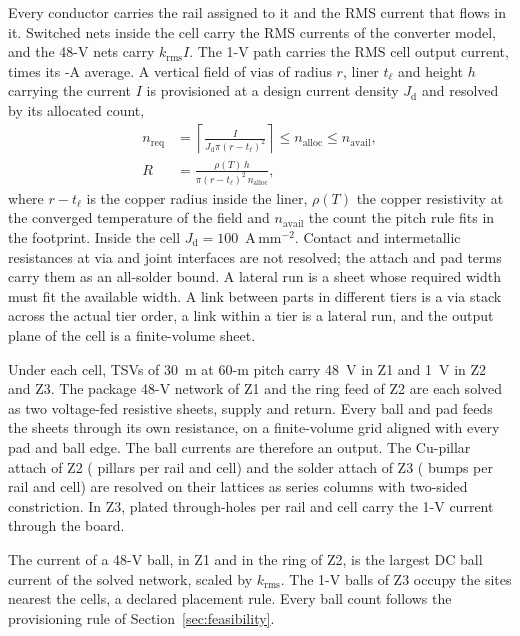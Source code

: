 Every conductor carries the rail assigned to it and the RMS current that flows in it. Switched
nets inside the cell carry the RMS currents of the converter model, and the 48-V nets carry
$k_{\mathrm{rms}} I$. The 1-V path carries the RMS cell output current, \MthIoutRatio{} times its
\FrConvIcell-A average. A vertical field of vias of radius $r$, liner $t_\ell$ and height $h$
carrying the current $I$ is provisioned at a design current density $J_{\mathrm{d}}$ and resolved
by its allocated count,
\begin{equation}
\begin{aligned}
n_{\mathrm{req}} &= \left\lceil \frac{I}{J_{\mathrm{d}}\pi(r-t_\ell)^2}\right\rceil \le
n_{\mathrm{alloc}} \le n_{\mathrm{avail}},\\
R &= \frac{\rho(T)\,h}{\pi(r-t_\ell)^2\,n_{\mathrm{alloc}}},
\end{aligned}
\label{eq:via}
\end{equation}
where $r-t_\ell$ is the copper radius inside the liner, $\rho(T)$ the copper resistivity at the
converged temperature of the field and $n_{\mathrm{avail}}$ the count the pitch rule fits in the
footprint. Inside the cell $J_{\mathrm{d}} = 100$~A\,mm$^{-2}$. Contact and intermetallic
resistances at via and joint interfaces are not resolved; the attach and pad terms carry them
as an all-solder bound. A lateral run is a sheet whose required width must fit the available
width. A link between parts in different tiers is a via stack across the actual tier order, a
link within a tier is a lateral run, and the output plane of the cell is a finite-volume sheet.

Under each cell, \MthTsvCell{} TSVs of 30~\textmu m at 60-\textmu m pitch carry 48~V in Z1 and
1~V in Z2 and Z3. The package 48-V network of Z1 and the ring feed of Z2 are each solved as two
voltage-fed resistive sheets, supply and return. Every ball and pad feeds the sheets through its
own resistance, on a finite-volume grid aligned with every pad and ball edge. The ball currents
are therefore an output. The Cu-pillar attach of Z2 (\MthPillarCell{} pillars per rail and cell)
and the solder attach of Z3 (\MthZthreeBumps{} bumps per rail and cell) are resolved on their
lattices as series columns with two-sided constriction. In Z3, \MthPthCell{} plated
through-holes per rail and cell carry the 1-V current through the board.

The current of a 48-V ball, in Z1 and in the ring of Z2, is the largest DC ball current of the
solved network, scaled by $k_{\mathrm{rms}}$. The 1-V balls of Z3 occupy the sites nearest the
cells, a declared placement rule. Every ball count follows the provisioning rule of
Section~\ref{sec:feasibility}.

